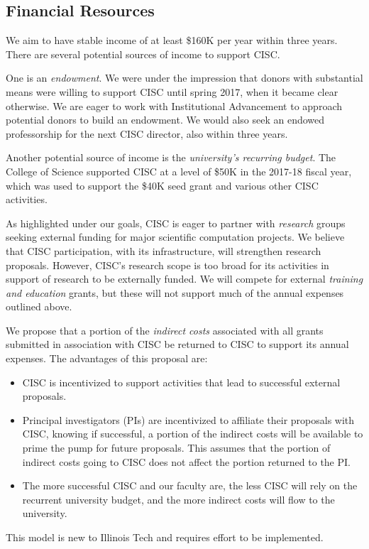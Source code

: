 \documentclass[12pt]{amsart}
\begin{document}
\subsection*{Financial Resources}
We aim to have stable income of at least \$160K per year within three years.
There are several potential sources of income to support CISC.  

One is an \emph{endowment}.  We were under the impression that donors with substantial means were willing to support CISC until spring 2017, when it became clear otherwise.  We are eager to work with Institutional Advancement to approach potential donors to build an endowment.  We would also seek an endowed professorship for the next CISC director, also within three years.

Another potential source of income is the \emph{university's recurring budget}.  The College of Science supported CISC at a level of \$50K in the 2017-18 fiscal year, which was used to support the \$40K seed grant and various other CISC activities.

As highlighted under our goals, CISC is eager to partner with \emph{research} groups seeking external funding for major scientific computation projects.  We believe that CISC participation, with its infrastructure, will strengthen research proposals.  However, CISC's research scope is too broad for its activities in support of research to be externally funded.  We will compete for external \emph{training and education} grants, but these will not support much of the annual expenses outlined above.

We propose that a portion of the \emph{indirect costs} associated with all grants submitted in association with CISC be returned to CISC to support its annual expenses.  The advantages of this proposal are:
\begin{itemize}
    \item CISC is incentivized to support activities that lead to successful external proposals.
    
    \item Principal investigators (PIs) are incentivized to affiliate their proposals with CISC, knowing if successful, a portion of the indirect costs will be available to prime the pump for future proposals.  This assumes that the portion of indirect costs going to CISC does not affect the portion returned to the PI.
    
    \item The more successful CISC and our faculty are, the less CISC will rely on the recurrent university budget, and the more indirect costs will flow to the university.
\end{itemize}
This model is new to Illinois Tech and requires effort to be implemented.
\end{document}
